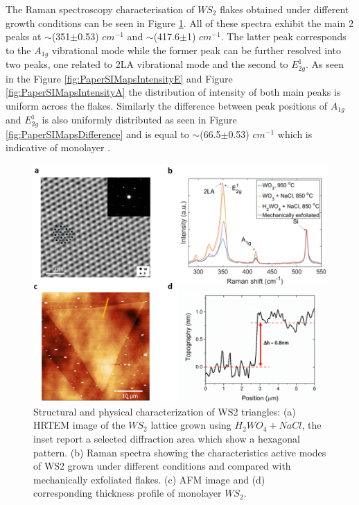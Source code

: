 The Raman spectroscopy characterisation of $WS_2$ flakes obtained under different growth conditions can be seen in Figure \ref{fig:PaperAFM}. All of these spectra exhibit the main 2 peaks at {$\sim$}(351{$\pm$}0.53) $cm^{−1}$ and {$\sim$}(417.6{$\pm$}1) $cm^{−1}$. The latter peak corresponds to the $A_{1g}$ vibrational mode while the former peak can be further resolved into two peaks, one related to 2LA vibrational mode and the second to $E^1_{2g}$. As seen in the Figure \ref{fig:PaperSIMapsIntensityE} and Figure \ref{fig:PaperSIMapsIntensityA} the distribution of intensity of both main peaks is uniform across the flakes. Similarly the difference between peak positions of $A_{1g}$ and $E^1_{2g}$ is also uniformly distributed as seen in Figure \ref{fig:PaperSIMapsDifference} and is equal to {$\sim$}(66.5{$\pm$}0.53) $cm^{−1}$ which is indicative of monolayer \cite{Withers2014}.

\begin{figure}[h]
\begin{center}
\includegraphics[scale=0.3]{PaperAFM.png}
\caption{Structural and physical characterization of WS2 triangles: (a) HRTEM image of the $WS_2$ lattice grown using $H_2WO_4+NaCl$, the inset report a selected diffraction area which show a hexagonal pattern. (b) Raman spectra showing the characteristics active modes of WS2 grown under different conditions and compared with mechanically exfoliated flakes. (c) AFM image and (d) corresponding thickness profile of monolayer $WS_2$.}
\label{fig:PaperAFM}
\end{center}
\end{figure}

